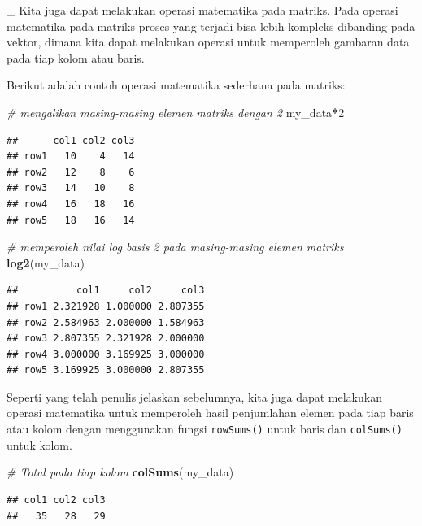 \documentclass[]{book}
\newenvironment{Shaded}{\begin{snugshade}}{\end{snugshade}}
\newcommand{\CommentTok}[1]{\textcolor[rgb]{0.56,0.35,0.01}{\textit{#1}}}
\newcommand{\DecValTok}[1]{\textcolor[rgb]{0.00,0.00,0.81}{#1}}
\newcommand{\KeywordTok}[1]{\textcolor[rgb]{0.13,0.29,0.53}{\textbf{#1}}}
\newcommand{\NormalTok}[1]{#1}
\newcommand{\OperatorTok}[1]{\textcolor[rgb]{0.81,0.36,0.00}{\textbf{#1}}}
\theoremstyle{definition}
\theoremstyle{definition}
\theoremstyle{definition}
\theoremstyle{remark}
\begin{document}
\_
Kita juga dapat melakukan operasi matematika pada matriks. Pada operasi matematika pada matriks proses yang terjadi bisa lebih kompleks dibanding pada vektor, dimana kita dapat melakukan operasi untuk memperoleh gambaran data pada tiap kolom atau baris.

Berikut adalah contoh operasi matematika sederhana pada matriks:

\begin{Shaded}
\begin{Highlighting}[]
\CommentTok{# mengalikan masing-masing elemen matriks dengan 2}
\NormalTok{my_data}\OperatorTok{*}\DecValTok{2}
\end{Highlighting}
\end{Shaded}

\begin{verbatim}
##      col1 col2 col3
## row1   10    4   14
## row2   12    8    6
## row3   14   10    8
## row4   16   18   16
## row5   18   16   14
\end{verbatim}

\begin{Shaded}
\begin{Highlighting}[]
\CommentTok{# memperoleh nilai log basis 2 pada masing-masing elemen matriks}
\KeywordTok{log2}\NormalTok{(my_data)}
\end{Highlighting}
\end{Shaded}

\begin{verbatim}
##          col1     col2     col3
## row1 2.321928 1.000000 2.807355
## row2 2.584963 2.000000 1.584963
## row3 2.807355 2.321928 2.000000
## row4 3.000000 3.169925 3.000000
## row5 3.169925 3.000000 2.807355
\end{verbatim}

Seperti yang telah penulis jelaskan sebelumnya, kita juga dapat melakukan operasi matematika untuk memperoleh hasil penjumlahan elemen pada tiap baris atau kolom dengan menggunakan fungsi \texttt{rowSums()} untuk baris dan \texttt{colSums()} untuk kolom.

\begin{Shaded}
\begin{Highlighting}[]
\CommentTok{# Total pada tiap kolom}
\KeywordTok{colSums}\NormalTok{(my_data)}
\end{Highlighting}
\end{Shaded}

\begin{verbatim}
## col1 col2 col3 
##   35   28   29
\end{verbatim}
\end{document}
